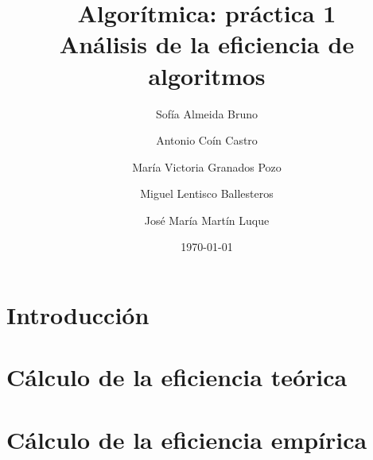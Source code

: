 \documentclass[11pt]{article}
\title{Algorítmica: práctica 1 \\ \large Análisis de la eficiencia de algoritmos}
\author{Sofía Almeida Bruno \and Antonio Coín Castro \and María Victoria Granados Pozo \and Miguel Lentisco Ballesteros \and José María Martín Luque}
\date{\today}
\begin{document}
\maketitle

\newpage

\section*{Introducción}

\section*{Cálculo de la eficiencia teórica}

\section*{Cálculo de la eficiencia empírica}
\end{document}
